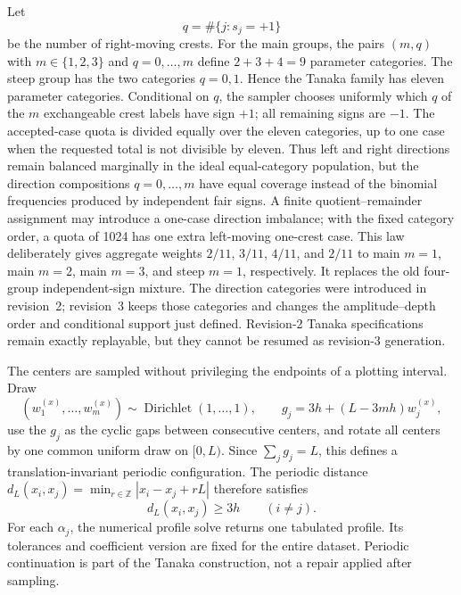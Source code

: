 \documentclass[11pt]{article}
\begin{document}
Let
\begin{equation}
  q=\#\{j:s_j=+1\}
  \label{eq:tanaka-right-moving-count}
\end{equation}
be the number of right-moving crests.  For the main groups, the pairs
$(m,q)$ with $m\in\{1,2,3\}$ and $q=0,\ldots,m$ define
$2+3+4=9$ parameter categories.  The steep group has the two categories
$q=0,1$.  Hence the Tanaka family has eleven parameter categories.
Conditional on $q$, the sampler chooses uniformly which $q$ of the $m$
exchangeable crest labels have sign $+1$; all remaining signs are $-1$.
The accepted-case quota is divided equally over the eleven categories, up to
one case when the requested total is not divisible by eleven.  Thus left and
right directions remain balanced marginally in the ideal equal-category
population, but the direction compositions $q=0,\ldots,m$ have equal coverage
instead of the binomial frequencies produced by independent fair signs.  A
finite quotient--remainder assignment may introduce a one-case direction
imbalance; with the fixed category order, a quota of 1024 has one extra
left-moving one-crest case.  This law deliberately gives
aggregate weights $2/11$, $3/11$, $4/11$, and $2/11$ to main $m=1$, main
$m=2$, main $m=3$, and steep $m=1$, respectively.  It replaces the old
four-group independent-sign mixture.  The direction categories were
introduced in revision~2; revision~3 keeps those categories and changes the
amplitude--depth order and conditional support just defined.  Revision-2
Tanaka specifications remain exactly replayable, but they cannot be resumed
as revision-3 generation.

The centers are sampled without privileging the endpoints of a plotting
interval.  Draw
\begin{equation}
  (w_1^{(x)},\ldots,w_m^{(x)})
  \sim\operatorname{Dirichlet}(1,\ldots,1),
  \qquad
  g_j=3h+(L-3mh)w_j^{(x)},
  \label{eq:tanaka-cyclic-gaps}
\end{equation}
use the $g_j$ as the cyclic gaps between consecutive centers, and rotate all
centers by one common uniform draw on $[0,L)$.  Since
$\sum_jg_j=L$, this defines a translation-invariant periodic configuration.
The periodic distance
$d_L(x_i,x_j)=\min_{r\in\mathbb Z}|x_i-x_j+rL|$ therefore satisfies
\begin{equation}
  d_L(x_i,x_j)\geq3h\qquad(i\ne j).
  \label{eq:tanaka-center-separation}
\end{equation}
For each $\alpha_j$, the numerical profile solve returns one tabulated
profile.  Its tolerances and coefficient version are fixed for the entire
dataset.
Periodic continuation is part of the Tanaka construction, not a repair
applied after sampling.
\end{document}
